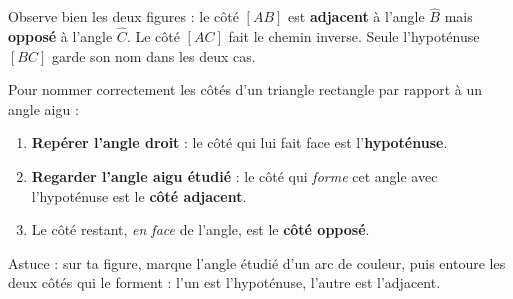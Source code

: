 \documentclass[11pt]{article}
\begin{document}
Observe bien les deux figures : le côté $[AB]$ est \textbf{adjacent} à l'angle $\widehat{B}$ mais \textbf{opposé} à l'angle $\widehat{C}$. Le côté $[AC]$ fait le chemin inverse. Seule l'hypoténuse $[BC]$ garde son nom dans les deux cas.

\begin{methode}
Pour nommer correctement les côtés d'un triangle rectangle par rapport à un angle aigu :
\begin{enumerate}
\item \textbf{Repérer l'angle droit} : le côté qui lui fait face est l'\textbf{hypoténuse}.
\item \textbf{Regarder l'angle aigu étudié} : le côté qui \emph{forme} cet angle avec l'hypoténuse est le \textbf{côté adjacent}.
\item Le côté restant, \emph{en face} de l'angle, est le \textbf{côté opposé}.
\end{enumerate}
Astuce : sur ta figure, marque l'angle étudié d'un arc de couleur, puis entoure les deux côtés qui le forment : l'un est l'hypoténuse, l'autre est l'adjacent.
\end{methode}
\end{document}

